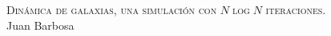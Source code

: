 \documentclass[handout]{beamer}
\begin{document}
{
	\begin{frame}
		\centering
		\color{white}
		\textsc{\LARGE Dinámica de galaxias, una simulación con $N\log N$ iteraciones.}
		\\
		\vspace{5cm}
		\raggedleft Juan Barbosa
	\end{frame}
}
\end{document}

